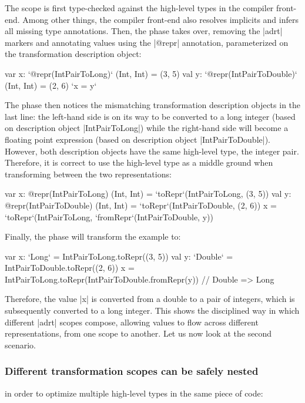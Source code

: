 The scope is first type-checked against the high-level types in the compiler front-end. Among other things, the compiler front-end also resolves implicits and infers all missing type annotations. Then, the  \inject{} phase takes over, removing the |adrt| markers and annotating values using the |@repr| annotation, parameterized on the transformation description object:

\begin{lstlisting-nobreak}
var x: `@repr(IntPairToLong)` (Int, Int) = (3, 5)
val y: `@repr(IntPairToDouble)` (Int, Int) = (2, 6)
`x = y`
\end{lstlisting-nobreak}

The \coerce{} phase then notices the mismatching transformation description objects in the last line: the left-hand side is on its way to be converted to a long integer (based on description object |IntPairToLong|) while the right-hand side will become a floating point expression (based on description object |IntPairToDouble|). However, both description objects have the same high-level type, the integer pair. Therefore, it is correct to use the high-level type as a middle ground when transforming between the two representations:

\begin{lstlisting-nobreak}
var x: @repr(IntPairToLong) (Int, Int) = `toRepr`(IntPairToLong, (3, 5))
val y: @repr(IntPairToDouble) (Int, Int) = `toRepr`(IntPairToDouble, (2, 6))
x = `toRepr`(IntPairToLong, `fromRepr`(IntPairToDouble, y))
\end{lstlisting-nobreak}

Finally, the \commit{} phase will transform the example to:

\begin{lstlisting-nobreak}
var x: `Long` = IntPairToLong.toRepr((3, 5))
val y: `Double` = IntPairToDouble.toRepr((2, 6))
x = IntPairToLong.toRepr(IntPairToDouble.fromRepr(y)) // Double => Long
\end{lstlisting-nobreak}

Therefore, the value |x| is converted from a double to a pair of integers, which is subsequently converted to a long integer. This shows the disciplined way in which different |adrt| scopes compose, allowing values to flow across different representations, from one scope to another. Let us now look at the second scenario.

\subsubsection{Different transformation scopes can be safely nested} in order to optimize multiple high-level types in the same piece of code:

